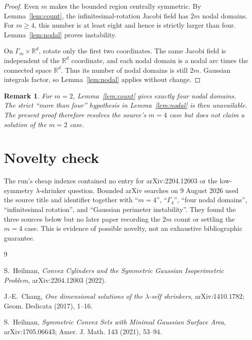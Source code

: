 \documentclass[11pt]{article}
\newtheorem{remark}[theorem]{Remark}
\newcommand{\R}{\mathbb R}
\begin{document}
\begin{proof}
Even $m$ makes the bounded region centrally symmetric.  By
Lemma~\ref{lem:count}, the infinitesimal-rotation Jacobi field has $2m$ nodal
domains.  For $m\geq4$, this number is at least eight and hence is strictly
larger than four.  Lemma~\ref{lem:nodal} proves instability.

On $\Gamma_m\times\R^d$, rotate only the first two coordinates.  The same
Jacobi field is independent of the $\R^d$ coordinate, and each nodal domain
is a nodal arc times the connected space $\R^d$.  Thus its number of nodal
domains is still $2m$.  Gaussian integrals factor, so
Lemma~\ref{lem:nodal} applies without change.
\end{proof}

\begin{remark}
For $m=2$, Lemma~\ref{lem:count} gives exactly four nodal domains.  The strict
``more than four'' hypothesis in Lemma~\ref{lem:nodal} is then unavailable.
The present proof therefore resolves the source's $m=4$ case but does not
claim a solution of the $m=2$ case.
\end{remark}

\section{Novelty check}

The run's cheap indexes contained no entry for arXiv:2204.12003 or the
low-symmetry $\lambda$-shrinker question.  Bounded arXiv searches on 9 August
2026 used the source title and identifier together with ``$m=4$'',
``$\Gamma_4$'', ``four nodal domains'', ``infinitesimal rotation'', and
``Gaussian perimeter instability''.  They found the three sources below but
no later paper recording the $2m$ count or settling the $m=4$ case.  This is
evidence of possible novelty, not an exhaustive bibliographic guarantee.

\begin{thebibliography}{9}

S.~Heilman,
\emph{Convex Cylinders and the Symmetric Gaussian Isoperimetric Problem},
arXiv:2204.12003 (2022).

J.-E.~Chang,
\emph{One dimensional solutions of the $\lambda$-self shrinkers},
arXiv:1410.1782; Geom. Dedicata (2017), 1--16.

S.~Heilman,
\emph{Symmetric Convex Sets with Minimal Gaussian Surface Area},
arXiv:1705.06643; Amer. J. Math. 143 (2021), 53--94.

\end{thebibliography}
\end{document}
